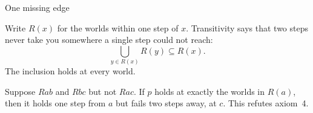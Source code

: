 \documentclass[12pt]{article}
\begin{document}
{\LARGE One missing edge\par}
\medskip
Write $R(x)$ for the worlds within one step of $x$.
Transitivity says that two steps never take you
somewhere a single step could not reach:
\[
  \bigcup_{y\in R(x)} R(y) \subseteq R(x).
\]
The inclusion holds at every world.

Suppose $Rab$ and $Rbc$ but not $Rac$.
If $p$ holds at exactly the worlds in $R(a)$,
then it holds one step from $a$ but fails
two steps away, at $c$. This refutes axiom~4.
\end{document}
